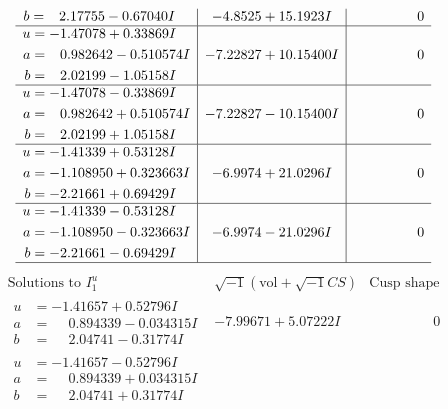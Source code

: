 \documentclass[1p]{elsarticle_modified}
\theoremstyle{definition}
\newcommand{\I}{\sqrt{-1}}
\begin{document}
$$\begin{array}{c|c|c}
\begin{aligned}
b &= \phantom{-}2.17755 - 0.67040 I\end{aligned}
 & -4.8525 + 15.1923 I & \phantom{-0.000000 } 0 \\ \hline\begin{aligned}
u &= -1.47078 + 0.33869 I \\
a &= \phantom{-}0.982642 - 0.510574 I \\
b &= \phantom{-}2.02199 - 1.05158 I\end{aligned}
 & -7.22827 + 10.15400 I & \phantom{-0.000000 } 0 \\ \hline\begin{aligned}
u &= -1.47078 - 0.33869 I \\
a &= \phantom{-}0.982642 + 0.510574 I \\
b &= \phantom{-}2.02199 + 1.05158 I\end{aligned}
 & -7.22827 - 10.15400 I & \phantom{-0.000000 } 0 \\ \hline\begin{aligned}
u &= -1.41339 + 0.53128 I \\
a &= -1.108950 + 0.323663 I \\
b &= -2.21661 + 0.69429 I\end{aligned}
 & -6.9974 + 21.0296 I & \phantom{-0.000000 } 0 \\ \hline\begin{aligned}
u &= -1.41339 - 0.53128 I \\
a &= -1.108950 - 0.323663 I \\
b &= -2.21661 - 0.69429 I\end{aligned}
 & -6.9974 - 21.0296 I & \phantom{-0.000000 } 0\\
 \hline 
 \end{array}$$\newpage$$\begin{array}{c|c|c}  
\text{Solutions to }I^u_{1}& \I (\text{vol} + \sqrt{-1}CS) & \text{Cusp shape}\\
 \hline 
\begin{aligned}
u &= -1.41657 + 0.52796 I \\
a &= \phantom{-}0.894339 - 0.034315 I \\
b &= \phantom{-}2.04741 - 0.31774 I\end{aligned}
 & -7.99671 + 5.07222 I & \phantom{-0.000000 } 0 \\ \hline\begin{aligned}
u &= -1.41657 - 0.52796 I \\
a &= \phantom{-}0.894339 + 0.034315 I \\
b &= \phantom{-}2.04741 + 0.31774 I\end{aligned}

\end{array}$$
\end{document}
